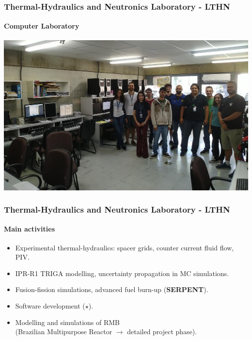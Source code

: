 \documentclass[svgnames,smaller,table]{beamer}
\begin{document}
\begin{frame}
  \frametitle{Thermal-Hydraulics and Neutronics Laboratory - LTHN}
  \framesubtitle{Computer Laboratory}
  \begin{center}
    \includegraphics[scale=0.3]{figuras/lthn-computers-cropped.jpg}
  \end{center}
\end{frame}

\begin{frame}
  \frametitle{Thermal-Hydraulics and Neutronics Laboratory - LTHN}
  \framesubtitle{Main activities}
  \begin{center}
    \begin{itemize}
    \item Experimental thermal-hydraulics: spacer grids, counter current fluid flow, PIV.
    \item IPR-R1 TRIGA modelling, uncertainty propagation in MC simulations.
    \item Fusion-fission simulations, advanced fuel burn-up (\textbf{SERPENT}).
    \item Software development ($\star$).
    \item Modelling and simulations of RMB\\ (Brazilian Multipurpose Reactor $\rightarrow$ detailed project phase).
    \end{itemize}
  \end{center}
\end{frame}
\end{document}
